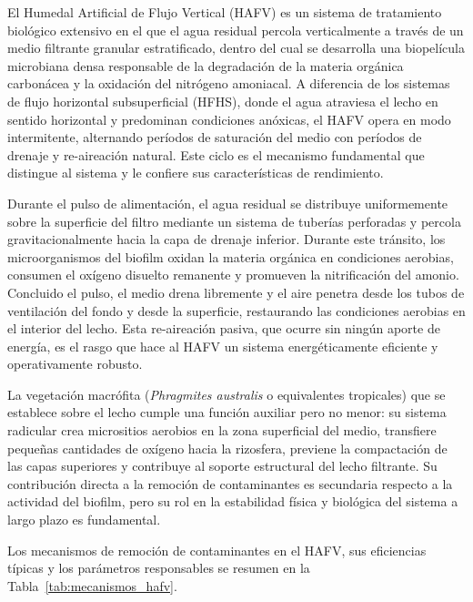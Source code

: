 


El Humedal Artificial de Flujo Vertical (HAFV) es un sistema de tratamiento biológico extensivo en el que el agua residual percola verticalmente a través de un medio filtrante granular estratificado, dentro del cual se desarrolla una biopelícula microbiana densa responsable de la degradación de la materia orgánica carbonácea y la oxidación del nitrógeno amoniacal. A diferencia de los sistemas de flujo horizontal subsuperficial (HFHS), donde el agua atraviesa el lecho en sentido horizontal y predominan condiciones anóxicas, el HAFV opera en modo intermitente, alternando períodos de saturación del medio con períodos de drenaje y re-aireación natural. Este ciclo es el mecanismo fundamental que distingue al sistema y le confiere sus características de rendimiento.

Durante el pulso de alimentación, el agua residual se distribuye uniformemente sobre la superficie del filtro mediante un sistema de tuberías perforadas y percola gravitacionalmente hacia la capa de drenaje inferior. Durante este tránsito, los microorganismos del biofilm oxidan la materia orgánica en condiciones aerobias, consumen el oxígeno disuelto remanente y promueven la nitrificación del amonio. Concluido el pulso, el medio drena libremente y el aire penetra desde los tubos de ventilación del fondo y desde la superficie, restaurando las condiciones aerobias en el interior del lecho. Esta re-aireación pasiva, que ocurre sin ningún aporte de energía, es el rasgo que hace al HAFV un sistema energéticamente eficiente y operativamente robusto.

La vegetación macrófita (\textit{Phragmites australis} o equivalentes tropicales) que se establece sobre el lecho cumple una función auxiliar pero no menor: su sistema radicular crea micrositios aerobios en la zona superficial del medio, transfiere pequeñas cantidades de oxígeno hacia la rizosfera, previene la compactación de las capas superiores y contribuye al soporte estructural del lecho filtrante. Su contribución directa a la remoción de contaminantes es secundaria respecto a la actividad del biofilm, pero su rol en la estabilidad física y biológica del sistema a largo plazo es fundamental.

Los mecanismos de remoción de contaminantes en el HAFV, sus eficiencias típicas y los parámetros responsables se resumen en la Tabla~\ref{tab:mecanismos_hafv}.

